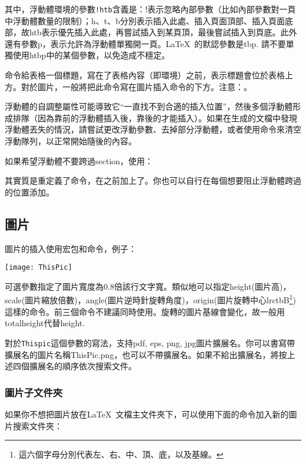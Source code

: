 其中，浮動體環境的參數\verb|!htb|含義是：!表示忽略內部參數（比如內部參數對一頁中浮動體數量的限制）；h、t、b分別表示插入此處、插入頁面頂部、插入頁面底部，故htb表示優先插入此處，再嘗試插入到某頁頂，最後嘗試插入到頁底。此外還有參數p，表示允許為浮動體單獨開一頁。\LaTeX\ 的默認參數是tbp. 請不要單獨使用htbp中的某個參數，以免造成不穩定。

命令給表格一個標題，寫在了表格內容（即環境）之前，表示標題會位於表格上方。對於圖片，一般將把此命令寫在圖片插入命令的下方。注意：。\dpar

浮動體的自調整屬性可能導致它“一直找不到合適的插入位置”，然後多個浮動體形成排隊（因為靠前的浮動體插入後，靠後的才能插入）。如果在生成的文檔中發現浮動體丟失的情況，請嘗試更改浮動參數、去掉部分浮動體，或者使用命令來清空浮動隊列，以正常開始隨後的內容。

如果希望浮動體不要跨過section，使用：
\begin{latex}
\usepackage[section]{placeins}
\end{latex}

其實質是重定義了命令，在之前加上了。你也可以自行在每個想要阻止浮動體跨過的位置添加。

\subsection{圖片}
圖片的插入使用宏包和命令，例子：
\begin{latex}
\begin{center}
    \texttt{[image: ThisPic]}
\end{center}
\end{latex}

可選參數指定了圖片寬度為0.8倍該行文字寬。類似地可以指定height(圖片高)，scale(圖片縮放倍數)，angle(圖片逆時針旋轉角度)，origin(圖片旋轉中心lrctbB\footnote{這六個字母分別代表左、右、中、頂、底，以及基線。})這樣的命令。前三個命令不建議同時使用。旋轉的圖片基線會變化，故一般用totalheight代替height. 

對於\texttt{Thispic}這個參數的寫法，\xelatex 支持pdf, eps, png, jpg圖片擴展名。你可以書寫帶擴展名的圖片名稱ThisPic.png，也可以不帶擴展名。如果不給出擴展名，將按上述四個擴展名的順序依次搜索文件。\dpar

\subsubsection{圖片子文件夾}
如果你不想把圖片放在\LaTeX\ 文檔主文件夾下，可以使用下面的命令加入新的圖片搜索文件夾：
\begin{latex}
\graphicspath{{c:/pics/}{./pic/}}
\end{latex}

